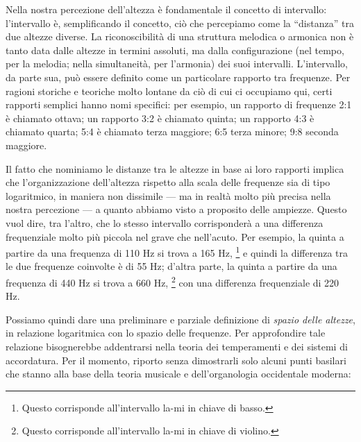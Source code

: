 Nella nostra percezione dell'altezza è fondamentale il concetto di intervallo: l'intervallo è, semplificando il concetto, ciò che percepiamo come la ``distanza'' tra due altezze diverse. La riconoscibilità di una struttura melodica o armonica non è tanto data dalle altezze in termini assoluti, ma dalla configurazione (nel tempo, per la melodia; nella simultaneità, per l'armonia) dei suoi intervalli. L'intervallo, da parte sua, può essere definito come un particolare rapporto tra frequenze. Per ragioni storiche e teoriche molto lontane da ciò di cui ci occupiamo qui, certi rapporti semplici hanno nomi specifici: per esempio, un rapporto di frequenze 2:1 è chiamato ottava; un rapporto 3:2 è chiamato quinta; un rapporto 4:3 è chiamato quarta; 5:4 è chiamato terza maggiore; 6:5 terza minore; 9:8 seconda maggiore.%

Il fatto che nominiamo le distanze tra le altezze in base ai loro rapporti implica che l'organizzazione dell'altezza rispetto alla scala delle frequenze sia di tipo logaritmico, in maniera non dissimile --- ma in realtà molto più precisa nella nostra percezione --- a quanto abbiamo visto a proposito delle ampiezze. Questo vuol dire, tra l'altro, che lo stesso intervallo corrisponderà a una differenza frequenziale molto più piccola nel grave che nell'acuto. Per esempio, la quinta a partire da una frequenza di 110 Hz si trova a 165 Hz,%
\footnote{Questo corrisponde all'intervallo la-mi in chiave di basso.}
e quindi la differenza tra le due frequenze coinvolte è di 55 Hz; d'altra parte, la quinta a partire da una frequenza di 440 Hz si trova a 660 Hz,
\footnote{Questo corrisponde all'intervallo la-mi in chiave di violino.}
con una differenza frequenziale di 220 Hz.

Possiamo quindi dare una preliminare e parziale definizione di \emph{spazio delle altezze}, in relazione logaritmica con lo spazio delle frequenze. Per approfondire tale relazione bisognerebbe addentrarsi nella teoria dei temperamenti e dei sistemi di accordatura. Per il momento, riporto senza dimostrarli solo alcuni punti basilari che stanno alla base della teoria musicale e dell'organologia occidentale moderna:

